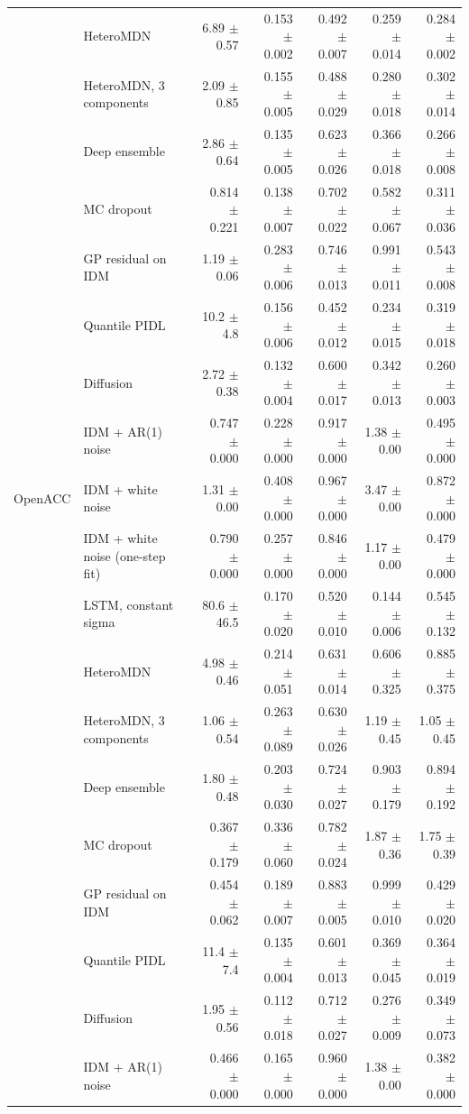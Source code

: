 \begin{longtable}{llrrrrr}
 & HeteroMDN & 6.89 $\pm$ 0.57 & 0.153 $\pm$ 0.002 & 0.492 $\pm$ 0.007 & 0.259 $\pm$ 0.014 & 0.284 $\pm$ 0.002 \\
 & HeteroMDN, 3 components & 2.09 $\pm$ 0.85 & 0.155 $\pm$ 0.005 & 0.488 $\pm$ 0.029 & 0.280 $\pm$ 0.018 & 0.302 $\pm$ 0.014 \\
 & Deep ensemble & 2.86 $\pm$ 0.64 & 0.135 $\pm$ 0.005 & 0.623 $\pm$ 0.026 & 0.366 $\pm$ 0.018 & 0.266 $\pm$ 0.008 \\
 & MC dropout & 0.814 $\pm$ 0.221 & 0.138 $\pm$ 0.007 & 0.702 $\pm$ 0.022 & 0.582 $\pm$ 0.067 & 0.311 $\pm$ 0.036 \\
 & GP residual on IDM & 1.19 $\pm$ 0.06 & 0.283 $\pm$ 0.006 & 0.746 $\pm$ 0.013 & 0.991 $\pm$ 0.011 & 0.543 $\pm$ 0.008 \\
 & Quantile PIDL & 10.2 $\pm$ 4.8 & 0.156 $\pm$ 0.006 & 0.452 $\pm$ 0.012 & 0.234 $\pm$ 0.015 & 0.319 $\pm$ 0.018 \\
 & Diffusion & 2.72 $\pm$ 0.38 & 0.132 $\pm$ 0.004 & 0.600 $\pm$ 0.017 & 0.342 $\pm$ 0.013 & 0.260 $\pm$ 0.003 \\
 & IDM + AR(1) noise & 0.747 $\pm$ 0.000 & 0.228 $\pm$ 0.000 & 0.917 $\pm$ 0.000 & 1.38 $\pm$ 0.00 & 0.495 $\pm$ 0.000 \\
\midrule
OpenACC & IDM + white noise & 1.31 $\pm$ 0.00 & 0.408 $\pm$ 0.000 & 0.967 $\pm$ 0.000 & 3.47 $\pm$ 0.00 & 0.872 $\pm$ 0.000 \\
 & IDM + white noise (one-step fit) & 0.790 $\pm$ 0.000 & 0.257 $\pm$ 0.000 & 0.846 $\pm$ 0.000 & 1.17 $\pm$ 0.00 & 0.479 $\pm$ 0.000 \\
 & LSTM, constant sigma & 80.6 $\pm$ 46.5 & 0.170 $\pm$ 0.020 & 0.520 $\pm$ 0.010 & 0.144 $\pm$ 0.006 & 0.545 $\pm$ 0.132 \\
 & HeteroMDN & 4.98 $\pm$ 0.46 & 0.214 $\pm$ 0.051 & 0.631 $\pm$ 0.014 & 0.606 $\pm$ 0.325 & 0.885 $\pm$ 0.375 \\
 & HeteroMDN, 3 components & 1.06 $\pm$ 0.54 & 0.263 $\pm$ 0.089 & 0.630 $\pm$ 0.026 & 1.19 $\pm$ 0.45 & 1.05 $\pm$ 0.45 \\
 & Deep ensemble & 1.80 $\pm$ 0.48 & 0.203 $\pm$ 0.030 & 0.724 $\pm$ 0.027 & 0.903 $\pm$ 0.179 & 0.894 $\pm$ 0.192 \\
 & MC dropout & 0.367 $\pm$ 0.179 & 0.336 $\pm$ 0.060 & 0.782 $\pm$ 0.024 & 1.87 $\pm$ 0.36 & 1.75 $\pm$ 0.39 \\
 & GP residual on IDM & 0.454 $\pm$ 0.062 & 0.189 $\pm$ 0.007 & 0.883 $\pm$ 0.005 & 0.999 $\pm$ 0.010 & 0.429 $\pm$ 0.020 \\
 & Quantile PIDL & 11.4 $\pm$ 7.4 & 0.135 $\pm$ 0.004 & 0.601 $\pm$ 0.013 & 0.369 $\pm$ 0.045 & 0.364 $\pm$ 0.019 \\
 & Diffusion & 1.95 $\pm$ 0.56 & 0.112 $\pm$ 0.018 & 0.712 $\pm$ 0.027 & 0.276 $\pm$ 0.009 & 0.349 $\pm$ 0.073 \\
 & IDM + AR(1) noise & 0.466 $\pm$ 0.000 & 0.165 $\pm$ 0.000 & 0.960 $\pm$ 0.000 & 1.38 $\pm$ 0.00 & 0.382 $\pm$ 0.000 \\
\end{longtable}
\endgroup
